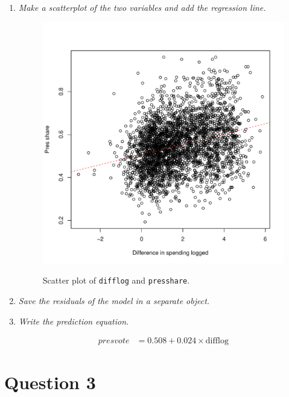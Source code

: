 \documentclass[12pt,letterpaper]{article}
\begin{document}
\begin{enumerate}
		\item \emph{Make a scatterplot of the two variables and add the regression line. }	\vspace{.25cm}
		
		
		\begin{figure}[h!]\centering
			\caption{\footnotesize Scatter plot of \texttt{difflog} and \texttt{presshare}.}\vspace{-1cm}
			\label{fig:Q2_b}
			\includegraphics[width=.65\textwidth]{Q2_b.pdf}\\
		\end{figure}
		
		\item \emph{Save the residuals of the model in a separate object.}	\vspace{.25cm}
		\vspace{.5cm}
		\item \emph{Write the prediction equation.}\vspace{.25cm}
		
		\begin{align*}
		presvote &= 0.508 + 0.024 \times \text{difflog}
		\end{align*}
	\end{enumerate}
\newpage
	\section*{Question 3}%
	
\end{document}
